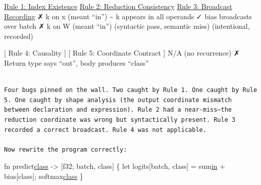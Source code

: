\documentclass[11pt,titlepage]{article}
\begin{document}
\protect\hyperlink{rule-1-index-existence}{Rule 1: Index Existence}
\protect\hyperlink{rule-2-reduction-consistency}{Rule 2: Reduction
Consistency} \protect\hyperlink{rule-3-broadcast-recording}{Rule 3:
Broadcast Recording} ✗ k on x (meant ``in'') \textasciitilde{} k appears
in all operands ✓ bias broadcasts over batch ✗ k on W (meant ``in'')
(syntactic pass, semantic miss) (intentional, recorded)

{[} Rule 4: Causality {]} {[} Rule 5: Coordinate Contract {]} N/A (no
recurrence) ✗ Return type says ``out'', body produces ``class''

\begin{verbatim}

Four bugs pinned on the wall. Two caught by Rule 1. One caught by Rule 5. One caught by shape analysis (the output coordinate mismatch between declaration and expression). Rule 2 had a near-miss—the reduction coordinate was wrong but syntactically present. Rule 3 recorded a correct broadcast. Rule 4 was not applicable.

Now rewrite the program correctly:
\end{verbatim}

fn
predict\href{x:\%20\%5Bf32;\%20batch,\%20in\%5D,\%20W:\%20\%5Bf32;\%20class,\%20in\%5D,\%20bias:\%20\%5Bf32;\%20class\%5D}{class}
-\textgreater{} {[}f32; batch, class{]} \{ let logits{[}batch, class{]}
= sum\href{x\%5Bbatch,\%20in\%5D\%20*\%20W\%5Bclass,\%20in\%5D}{in} +
bias{[}class{]}; softmax\href{logits\%5Bbatch,\%20class\%5D}{class} \}
\end{document}
